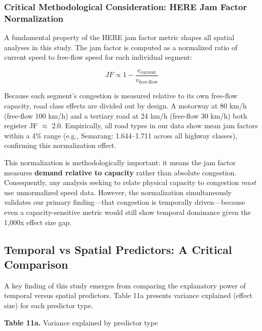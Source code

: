\documentclass[12pt,a4paper]{article}
\begin{document}
\subsubsection{Critical Methodological Consideration: HERE Jam Factor Normalization}

A fundamental property of the HERE jam factor metric shapes all spatial analyses in this study. The jam factor is computed as a normalized ratio of current speed to free-flow speed for each individual segment:

\[JF \propto 1 - \frac{v_{\text{current}}}{v_{\text{free-flow}}}\]

Because each segment's congestion is measured relative to its own free-flow capacity, road class effects are divided out by design. A motorway at 80 km/h (free-flow 100 km/h) and a tertiary road at 24 km/h (free-flow 30 km/h) both register JF $\approx$ 2.0. Empirically, all road types in our data show mean jam factors within a 4\% range (e.g., Semarang: 1.644--1.711 across all highway classes), confirming this normalization effect.

This normalization is methodologically important: it means the jam factor measures \textbf{demand relative to capacity} rather than absolute congestion. Consequently, any analysis seeking to relate physical capacity to congestion \emph{must} use unnormalized speed data. However, the normalization simultaneously validates our primary finding---that congestion is temporally driven---because even a capacity-sensitive metric would still show temporal dominance given the 1,000x effect size gap.

\subsection{Temporal vs Spatial Predictors: A Critical Comparison}

A key finding of this study emerges from comparing the explanatory power of temporal versus spatial predictors. Table 11a presents variance explained (effect size) for each predictor type.

\textbf{Table 11a.} Variance explained by predictor type
\end{document}
